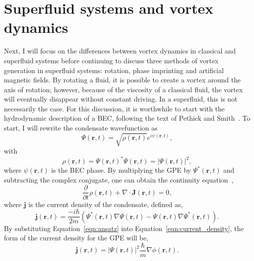 \section{Superfluid systems and vortex dynamics}

Next, I will focus on the differences between vortex dynamics in classical and superfluid systems before continuing to discuss three methods of vortex generation in superfluid systems: rotation, phase imprinting and artificial magnetic fields.
By rotating a fluid, it is possible to create a vortex around the axis of rotation; however, because of the viscosity of a classical fluid, the vortex will eventually disappear without constant driving.
In a superfluid, this is not necessarily the case.
For this discussion, it is worthwhile to start with the hydrodynamic description of a BEC, following the text of Pethick and Smith~\cite{pethick2002}.
To start, I will rewrite the condensate wavefunction as
\begin{equation}
\Psi(\mathbf{r},t) = \sqrt{\rho(\mathbf{r},t)}e^{i\psi(\mathbf{r},t)},
\label{eqn:ansatz}
\end{equation}
\noindent with
\begin{equation}
\rho(\mathbf{r},t)=\Psi(\mathbf{r},t)^*\Psi(\mathbf{r},t) = |\Psi(\mathbf{r},t)|^2,
\end{equation}
\noindent where $\psi(\mathbf{r},t)$ is the BEC phase.
By multiplying the GPE by $\Psi^*(\mathbf{r},t)$ and subtracting the complex conjugate, one can obtain the continuity equation~\cite{pethick2002},
\begin{equation}
\frac{\partial}{\partial t}\rho(\mathbf{r},t)+\nabla\cdot\mathbf{J}(\mathbf{r},t) = 0,
\end{equation}
\noindent where $\mathbf{j}$ is the current density of the condensate, defined as,
\begin{equation}
\mathbf{j}(\mathbf{r},t) = \frac{-i\hbar}{2m}\left( \Psi^*(\mathbf{r},t)\nabla\Psi(\mathbf{r},t)- \Psi(\mathbf{r},t)\nabla\Psi^*(\mathbf{r},t)\right).
\label{eqn:current_density}
\end{equation}
By substituting Equation~\eqref{eqn:ansatz} into Equation~\eqref{eqn:current_density}, the form of the current density for the GPE will be,
\begin{equation}
\mathbf{j}(\mathbf{r},t) = |\Psi(\mathbf{r},t)|^2\frac{\hbar}{m}\nabla\phi(\mathbf{r},t).
\end{equation}

